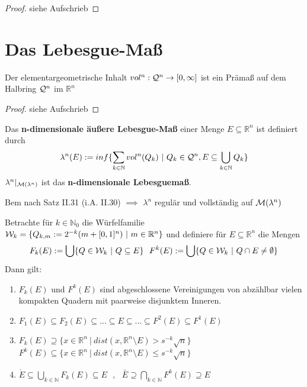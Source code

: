 \documentclass[11pt,a4paper,fleqn,openany]{report}
\begin{document}
    \begin{proof}
      siehe Aufschrieb
    \end{proof}

  \chapter{Das Lebesgue-Maß}
    \begin{lemma}
      Der elementargeometrische Inhalt $vol^n: \mathcal{Q}^n \to [0, \infty]$ ist ein Prämaß auf dem Halbring $\mathcal{Q}^n$ im $\mathbb{R}^n$
    \end{lemma}

    \begin{proof}
      siehe Aufschrieb
    \end{proof}

    \begin{definition}
      Das \textbf{n-dimensionale äußere Lebesgue-Maß} einer Menge $E \subseteq \mathbb{R}^n$ ist definiert durch
      \begin{align*}
        \lambda^n(E) := inf\{\sum\limits_{k \in \mathbb{N}} vol^n(Q_k) \ | \ Q_k \in \script{Q}^n, E \subseteq \bigcup\limits_{k \in \mathbb{N}} Q_k\}
      \end{align*}
      $\lambda^n|_{\mathcal{M}(\lambda^n)}$ ist das \textbf{n-dimensionale Lebesguemaß}.
    \end{definition}

    \begin{remark}
      Bem nach Satz II.31 (i.A. II.30) $\implies$ $\lambda^n$ regulär und vollständig auf $\mathcal{M}(\lambda^n)$
    \end{remark}

    \begin{lemma}
      Betrachte für $k \in \mathbb{N}_0$ die Würfelfamilie $\mathcal{W}_k = \{Q_{k,m} := 2^{-k}(m + [0,1]^n) \ | \ m \in \mathbb{R}^n\}$ und definiere für $E \subseteq \mathbb{R}^n$ die Mengen
      \begin{align*}
      F_k(E) := \bigcup \{Q \in \mathcal{W}_k \ | \ Q \subseteq E\} \ \
      F^k(E) := \bigcup \{Q \in \mathcal{W}_k \ | \ Q \cap E \neq \emptyset\}
      \end{align*}
      Dann gilt:
      \begin{enumerate}[label=\roman*)]
        \item $F_k(E)$ und $F^k(E)$ sind abgeschlossene Vereinigungen von abzählbar vielen kompakten Quadern mit paarweise disjunktem Inneren.
        \item $F_1(E) \subseteq F_2(E) \subseteq ... \subseteq E \subseteq ... \subseteq F^2(E) \subseteq F^1(E)$ 
        \item $F_k(E) \supseteq \{x \in \mathbb{R}^n \ | \ dist(x, \mathbb{R}^n \setminus E) > s^{-k} \sqrt{n}\}$\\
        $F^k(E) \subseteq \{x \in \mathbb{R}^n \ | \ dist(x, \mathbb{R}^n \setminus E) \leq s^{-k} \sqrt{n}\}$
        \item $\mathring{E} \subseteq \bigcup\limits_{k \in \mathbb{N}} F_k(E) \subseteq E \ \ \ , \ \ \ \bar{E} \supseteq \bigcap\limits_{k \in \mathbb{N}} F^k(E) \supseteq E$
      \end{enumerate}
    \end{lemma}
\end{document}
